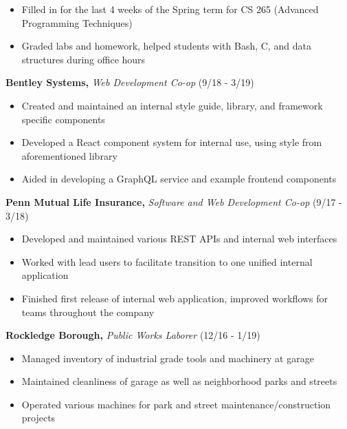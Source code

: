 \documentclass[10pt]{article}
\begin{document}
\vspace{-\topsep}
\begin{itemize}
    \setlength\itemsep{-0.5em}
    \item Filled in for the last 4 weeks of the Spring term for CS 265
        (Advanced Programming Techniques)
    \item Graded labs and homework, helped students with Bash, C, and
        data structures during office hours
\end{itemize}

\vspace{-0.5em}
\textbf{Bentley Systems,}
\emph{Web Development Co-op}
(9/18 - 3/19)

\vspace{-\topsep}
\begin{itemize}
    \setlength\itemsep{-0.5em}
    \item Created and maintained an internal style
        guide, library, and framework specific components
    \item Developed a React component system for internal use, using style
        from aforementioned library
    \item Aided in developing a GraphQL service and example frontend
        components
\end{itemize}

\vspace{-0.5em}
\textbf{Penn Mutual Life Insurance,}
\emph{Software and Web Development Co-op}
(9/17 - 3/18)

\vspace{-\topsep}
\begin{itemize}
    \setlength\itemsep{-0.5em}
    \item Developed and maintained various REST APIs and
        internal web interfaces
    \item Worked with lead users to facilitate transition to one unified
        internal application
    \item Finished first release of internal web application,
        improved workflows for teams throughout the company
\end{itemize}

\vspace{-0.5em}
\textbf{Rockledge Borough,}
\emph{Public Works Laborer}
(12/16 - 1/19)

\vspace{-\topsep}
\begin{itemize}
    \setlength\itemsep{-0.5em}
    \item Managed inventory of industrial grade tools and machinery
        at garage
    \item Maintained cleanliness of garage as well as neighborhood
        parks and streets
    \item Operated various machines for park and street
        maintenance/construction projects
\end{itemize}
\end{document}
